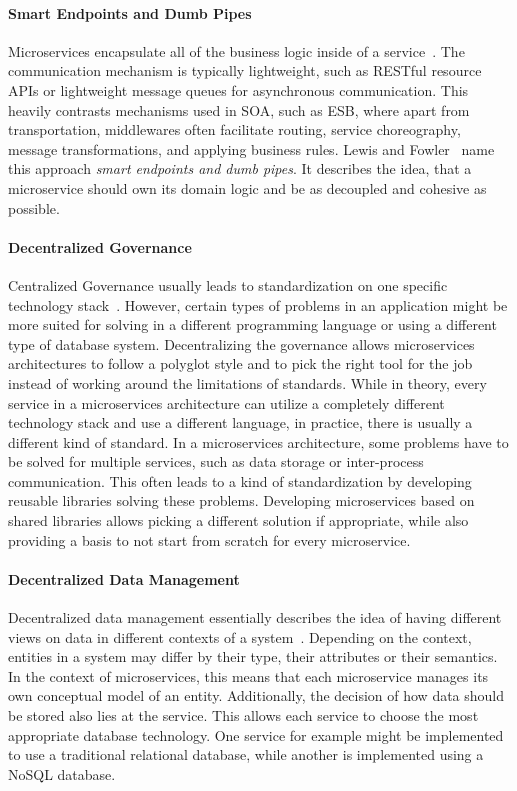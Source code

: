 \paragraph{Smart Endpoints and Dumb Pipes}

Microservices encapsulate all of the business logic inside of a service~\cite{Lewis2014}.
The communication mechanism is typically lightweight, such as \ac{REST}ful resource \acp{API} or lightweight message queues for asynchronous communication.
This heavily contrasts mechanisms used in \ac{SOA}, such as \ac{ESB}, where apart from transportation, middlewares often facilitate routing, service choreography, message transformations, and applying business rules.
Lewis and Fowler~\cite{Lewis2014} name this approach \textit{smart endpoints and dumb pipes}.
It describes the idea, that a microservice should own its domain logic and be as decoupled and cohesive as possible.

\paragraph{Decentralized Governance}

Centralized Governance usually leads to standardization on one specific technology stack~\cite{Lewis2014}.
However, certain types of problems in an application might be more suited for solving in a different programming language or using a different type of database system.
Decentralizing the governance allows microservices architectures to follow a polyglot style and to pick the right tool for the job instead of working around the limitations of standards.
While in theory, every service in a microservices architecture can utilize a completely different technology stack and use a different language, in practice, there is usually a different kind of standard.
In a microservices architecture, some problems have to be solved for multiple services, such as data storage or inter-process communication.
This often leads to a kind of standardization by developing reusable libraries solving these problems.
Developing microservices based on shared libraries allows picking a different solution if appropriate, while also providing a basis to not start from scratch for every microservice.


\paragraph{Decentralized Data Management}

Decentralized data management essentially describes the idea of having different views on data in different contexts of a system~\cite{Lewis2014}.
Depending on the context, entities in a system may differ by their type, their attributes or their semantics.
In the context of microservices, this means that each microservice manages its own conceptual model of an entity.
Additionally, the decision of how data should be stored also lies at the service.
This allows each service to choose the most appropriate database technology.
One service for example might be implemented to use a traditional relational database, while another is implemented using a NoSQL database.

